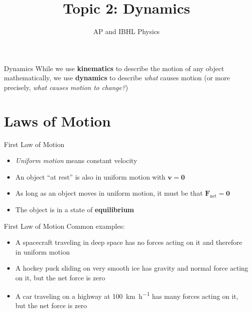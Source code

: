 \documentclass[12pt,compress,aspectratio=169]{beamer}
\title{Topic 2: Dynamics}
\subtitle{AP and IBHL Physics}
\begin{document}
\begin{frame}
  \maketitle
\end{frame}

\begin{frame}{Dynamics}
  While we use \textbf{kinematics} to describe the motion of any object
  mathematically, we use \textbf{dynamics} to describe \emph{what} causes
  motion (or more precisely, \emph{what causes motion to change?})
\end{frame}



\section{Laws of Motion}

\begin{frame}{First Law of Motion}
  \begin{center}
  \end{center}
  \begin{itemize}
  \item \emph{Uniform motion} means constant velocity
  \item An object ``at rest'' is also in uniform motion with $\bm{v}=\bm{0}$
  \item As long as an object moves in uniform motion, it must be that
    $\bm{F}_\text{net}=\bm{0}$
  \item The object is in a state of \textbf{equilibrium}
  \end{itemize}
\end{frame}



\begin{frame}{First Law of Motion}
  Common examples:
  \begin{itemize}
  \item A spacecraft traveling in deep space has no forces acting on it
    and therefore in uniform motion
  \item A hockey puck sliding on very smooth ice has gravity and normal
    force acting on it, but the net force is zero
  \item A car traveling on a highway at \SI{100}{\kilo\metre\per\hour}
    has many forces acting on it, but the net force is zero 
  \end{itemize}
\end{frame}
\end{document}
